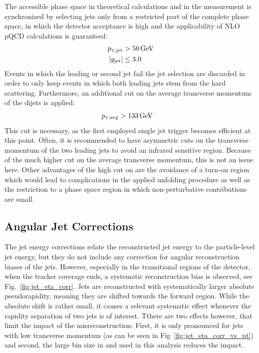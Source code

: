 The accessible phase space in theoretical calculations and in the measurement is
synchronized by selecting jets only from a restricted part of the complete phase
space, in which the detector acceptance is high and the applicability of NLO
pQCD calculations is guaranteed:
%
\begin{align*}
    \ptjet &> \SI{50}{\GeV}\\
    |y_\mathrm{jet}| &\leq 3.0\\
\end{align*}
%
Events in which the leading or second jet fail the jet selection are
discarded in order to only keep events in which both leading jets stem
from the hard scattering. Furthermore, an additional cut on the
average transverse momentum of the dijets is applied:
%
\begin{align*}
    \ptavg &> \SI{133}{\GeV}
\end{align*}
%
This cut is necessary, as the first employed single jet trigger becomes
efficient at this point. Often, it is recommended to have asymmetric cuts on the
transverse momentum of the two leading jets to avoid an infrared sensitive
region. Because of the much higher cut on the average transverse momentum, this
is not an issue here. Other advantages of the high cut on \ptavg are the
avoidance of a turn-on region which would lead to complications in the applied
unfolding procedure as well as the restriction to a phase space region in which
non-perturbative contributions are small.

\subsection{Angular Jet Corrections}

The jet energy corrections relate the reconstructed jet energy to the particle-level jet energy, but they do not include any correction for angular
reconstruction biases of the jets. However, especially in the transitional
regions of the detector, \ie when the tracker coverage ends, a systematic
reconstruction bias is observed, see Fig.~\ref{fig:jet_eta_corr}. Jets are
reconstructed with systematically larger absolute pseudorapidity, meaning they
are shifted towards the forward region. While the absolute shift is rather
small, it causes a relevant systematic effect whenever the rapidity separation
of two jets is of interest. Tthere are two effects however, that limit the impact of the
misreconstruction: First, it is only pronounced for jets with low transverse momentum
(as can be seen in Fig~\ref{fig:jet_eta_corr_vs_pt}) and second, the large bin
size in \ystar and \yboost used in this analysis reduces the impact. 

